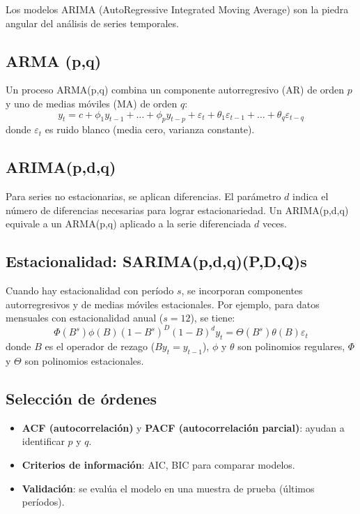 \documentclass[12pt,a4paper,openany,oneside]{book}
\begin{document}
Los modelos ARIMA (AutoRegressive Integrated Moving Average) son la piedra angular del análisis de series temporales.

\subsection{ARMA (p,q)}
Un proceso ARMA(p,q) combina un componente autorregresivo (AR) de orden \(p\) y uno de medias móviles (MA) de orden \(q\):
\[
y_t = c + \phi_1 y_{t-1} + \dots + \phi_p y_{t-p} + \varepsilon_t + \theta_1 \varepsilon_{t-1} + \dots + \theta_q \varepsilon_{t-q}
\]
donde \(\varepsilon_t\) es ruido blanco (media cero, varianza constante).

\subsection{ARIMA(p,d,q)}
Para series no estacionarias, se aplican diferencias. El parámetro \(d\) indica el número de diferencias necesarias para lograr estacionariedad. Un ARIMA(p,d,q) equivale a un ARMA(p,q) aplicado a la serie diferenciada \(d\) veces.

\subsection{Estacionalidad: SARIMA(p,d,q)(P,D,Q)s}
Cuando hay estacionalidad con período \(s\), se incorporan componentes autorregresivos y de medias móviles estacionales. Por ejemplo, para datos mensuales con estacionalidad anual (\(s=12\)), se tiene:
\[
\Phi(B^s) \phi(B) (1-B^s)^D (1-B)^d y_t = \Theta(B^s) \theta(B) \varepsilon_t
\]
donde \(B\) es el operador de rezago (\(B y_t = y_{t-1}\)), \(\phi\) y \(\theta\) son polinomios regulares, \(\Phi\) y \(\Theta\) son polinomios estacionales.

\subsection{Selección de órdenes}
\begin{itemize}
    \item \textbf{ACF (autocorrelación)} y \textbf{PACF (autocorrelación parcial)}: ayudan a identificar \(p\) y \(q\).
    \item \textbf{Criterios de información}: AIC, BIC para comparar modelos.
    \item \textbf{Validación}: se evalúa el modelo en una muestra de prueba (últimos períodos).
\end{itemize}
\end{document}
